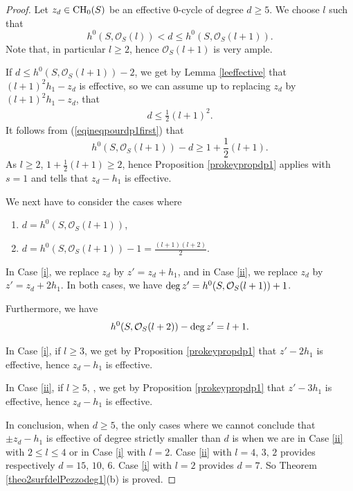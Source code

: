 \documentclass[10pt]{article}
\begin{document}
\begin{proof}
Let $z_d\in {\rm CH}_0(S)$ be an effective $0$-cycle of degree $d\geq 5$. We choose $l$ such that
$$h^0(S,\mathcal{O}_S(l))<d\leq  h^0(S,\mathcal{O}_S(l+1)).$$
Note that, in particular $l\geq 2$, hence $\mathcal{O}_S(l+1)$ is very ample.

If $d\leq h^0(S,\mathcal{O}_S(l+1))-2$, we get by Lemma \ref{leeffective} that $(l+1)^2h_1-z_d$ is effective, so we can assume up to replacing $z_d$ by  $(l+1)^2h_1-z_d$, that
\begin{eqnarray}\label{eqineqpourdp1first} d\leq \frac{1}{2}(l+1)^2.\end{eqnarray}
It follows from (\ref{eqineqpourdp1first}) that
$$ h^0(S,\mathcal{O}_S(l+1))-d\geq 1+\frac{1}{2}(l+1).$$
As $l\geq 2$,  $1+\frac{1}{2}(l+1)\geq 2$, hence Proposition \ref{prokeypropdp1} applies with $s=1$ and tells that $z_d-h_1$ is effective.

We next have to consider the cases where
\begin{enumerate}
\item \label{i} $d= h^0(S,\mathcal{O}_S(l+1))$,
\item  \label{ii}  $d= h^0(S,\mathcal{O}_S(l+1))-1=\frac{(l+1)(l+2)}{2}$.
\end{enumerate}
In  Case \ref{i}, we replace $z_d$ by $z'=z_d+h_1$, and in Case \ref{ii}, we replace $z_d$ by $z'=z_d+2h_1$. In both cases, we have ${\rm deg}\,z'=h^0(S,\mathcal{O}_S(l+1))+1$.

Furthermore, we have
$$h^0(S,\mathcal{O}_S(l+2))-{\rm deg}\,z'=l+1.$$

In  Case \ref{i}, if $l\geq 3$, we get by Proposition \ref{prokeypropdp1} that
$z'-2h_1$ is effective, hence $z_d-h_1$ is effective.

In Case \ref{ii}, if  $l\geq 5$, , we get by Proposition \ref{prokeypropdp1} that
$z'-3h_1$ is effective, hence $z_d-h_1$ is effective.

In conclusion, when $d\geq 5$, the only cases where we cannot conclude that $\pm z_d-h_1$ is effective of degree strictly smaller than $d$ is when we are in Case \ref{ii}  with $2\leq l\leq 4$ or  in Case \ref{i} with $l= 2$.
 Case \ref{ii}  with $l= 4,\,3,\,2$ provides respectively $d=15,\,10,\,6$. Case \ref{i} with $l= 2$ provides $d=7$. So Theorem \ref{theo2surfdelPezzodeg1}(b) is proved.
\end{proof}
\end{document}
